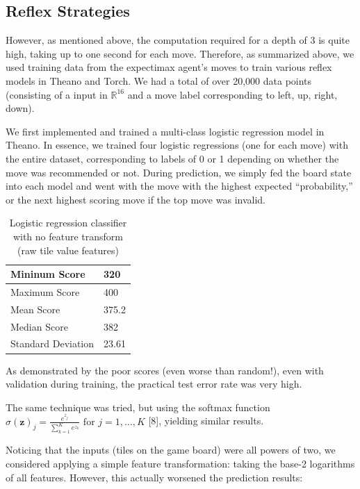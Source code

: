 \documentclass[9pt,twocolumn]{article}
\begin{document}
\subsection{Reflex Strategies}

However, as mentioned above, the computation required for a depth of 3 is quite high, taking up to one second for each move. Therefore, as summarized above, we used training data from the expectimax agent's moves to train various reflex models in Theano and Torch. We had a total of over 20,000 data points (consisting of a input in $\mathbb{R}^{16}$ and a move label corresponding to left, up, right, down).

We first implemented and trained a multi-class logistic regression model in Theano. In essence, we trained four logistic regressions (one for each move) with the entire dataset, corresponding to labels of 0 or 1 depending on whether the move was recommended or not. During prediction, we simply fed the board state into each model and went with the move with the highest expected “probability,” or the next highest scoring move if the top move was invalid.

\begin{table}[!htbp]

\centering

\begin{tabular}{|l|l|}
\hline
Mininum Score      & 320 \\ \hline
Maximum Score      & 400 \\ \hline
Mean Score         & 375.2 \\ \hline
Median Score       & 382 \\ \hline
Standard Deviation & 23.61 \\ \hline
\end{tabular}

\caption{Logistic regression classifier with no feature transform (raw tile value features)}

\end{table}

As demonstrated by the poor scores (even worse than random!), even with validation during training, the practical test error rate was very high.

The same technique was tried, but using the softmax function $\sigma(\mathbf{z})_j = \frac{e^{z_j}}{\sum_{k=1}^K e^{z_k}} \text{ for } j = 1, \dots, K$ [8], yielding similar results.

Noticing that the inputs (tiles on the game board) were all powers of two, we considered applying a simple feature transformation: taking the base-2 logarithms of all features. However, this actually worsened the prediction results:
\end{document}
